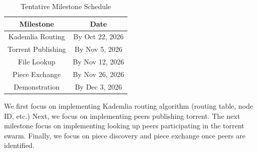 \begin{table}[h]
    \caption{Tentative Milestone Schedule}
    \vspace{12pt}
    \centering
    \begin{tabular}{|c|c|}
        \hline
        Milestone          & Date \\
        \hline
        Kademlia Routing   & By Oct 22, 2026 \\
        Torrent Publishing & By Nov 5, 2026 \\
        File Lookup        & By Nov 12, 2026 \\
        Piece Exchange     & By Nov 26, 2026 \\
        Demonstration      & By Dec 3, 2026 \\
        \hline
    \end{tabular}
    \label{tab:Milestone Schedule}
\end{table}

We first focus on implementing Kademlia routing algorithm (routing table, node ID, etc.) Next, we focus on implementing peers publishing torrent.
The next milestone focus on implementing looking up peers participating in the torrent swarm. Finally, we focus on piece discovery and piece exchange once peers are identified.
